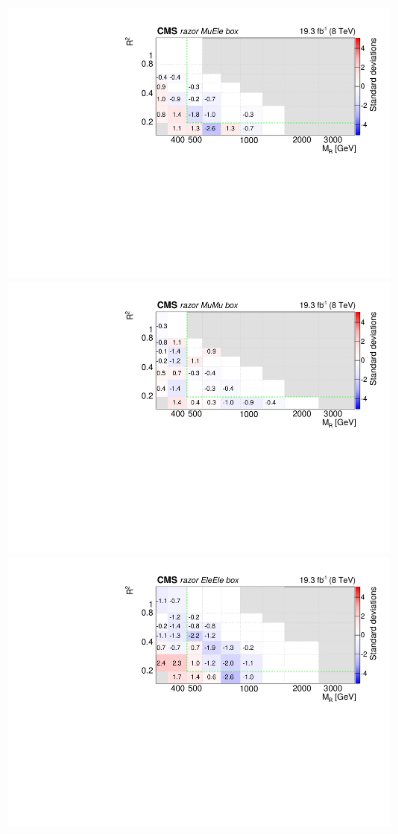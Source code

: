\begin{figure}[tb!]
\centering
\includegraphics[width=0.9\textwidth]{figs/analysis8TeV/nSigmaLog_MuEle.pdf}
\includegraphics[width=0.9\textwidth]{figs/analysis8TeV/nSigmaLog_MuMu.pdf}
\includegraphics[width=0.9\textwidth]{figs/analysis8TeV/nSigmaLog_EleEle.pdf}

\end{figure}
